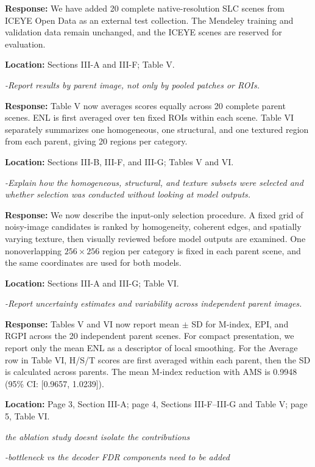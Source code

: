 \documentclass[11pt,letterpaper]{article}
\newcommand{\reviewgroup}[1]{%
  \Needspace{5\baselineskip}%
  \medskip\textit{#1}\par
}
\begin{document}
\textbf{Response:} We have added 20 complete native-resolution SLC scenes from ICEYE Open Data as an external test collection. The Mendeley training and validation data remain unchanged, and the ICEYE scenes are reserved for evaluation.

\textbf{Location:} Sections III-A and III-F; Table V.

\textit{-Report results by parent image, not only by pooled patches or ROIs.}

\textbf{Response:} Table V now averages scores equally across 20 complete parent scenes. ENL is first averaged over ten fixed ROIs within each scene. Table VI separately summarizes one homogeneous, one structural, and one textured region from each parent, giving 20 regions per category.

\textbf{Location:} Sections III-B, III-F, and III-G; Tables V and VI.

\textit{-Explain how the homogeneous, structural, and texture subsets were selected and whether selection was conducted without looking at model outputs.}

\textbf{Response:} We now describe the input-only selection procedure. A fixed grid of noisy-image candidates is ranked by homogeneity, coherent edges, and spatially varying texture, then visually reviewed before model outputs are examined. One nonoverlapping \(256\times256\) region per category is fixed in each parent scene, and the same coordinates are used for both models.

\textbf{Location:} Sections III-A and III-G; Table VI.

\textit{-Report uncertainty estimates and variability across independent parent images.}

\textbf{Response:} Tables V and VI now report mean $\pm$ SD for M-index, EPI, and RGPI across the 20 independent parent scenes. For compact presentation, we report only the mean ENL as a descriptor of local smoothing. For the Average row in Table VI, H/S/T scores are first averaged within each parent, then the SD is calculated across parents. The mean M-index reduction with AMS is 0.9948 (95\% CI: [0.9657, 1.0239]).

\textbf{Location:} Page 3, Section III-A; page 4, Sections III-F--III-G and Table V; page 5, Table VI.

\reviewgroup{the ablation study doesn\textquotesingle{}t isolate the contributions}

\textit{-bottleneck vs the decoder FDR components need to be added}
\end{document}
